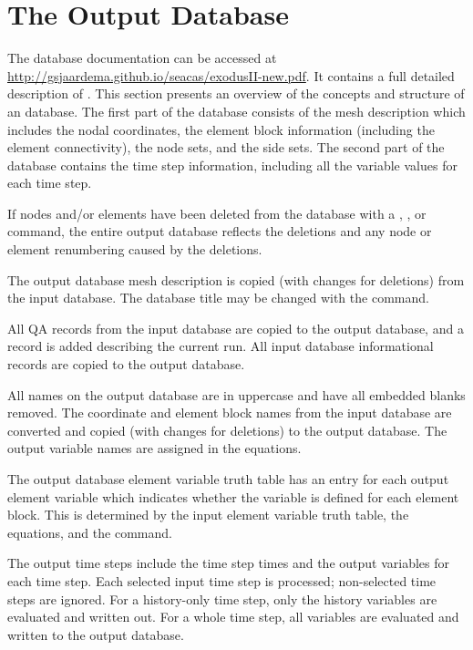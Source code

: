 \chapter{The Output \exo{} Database} \label{chap:outexo}

The \exo{} database documentation can be accessed at
\url{http://gsjaardema.github.io/seacas/exodusII-new.pdf}. It contains
a full detailed description of \exo{}. This section presents an
overview of the concepts and structure of an \exo{} database. The
first part of the \exo{} database consists of the mesh
description which includes the nodal coordinates, the
element block information (including the element connectivity), the
node sets, and the side sets. The second part of the database contains
the time step information, including all the variable values for each
time step.

If nodes and/or elements have been deleted from the database with a
, , or  command, the entire output
database reflects the deletions and any node or element renumbering
caused by the deletions.

The output database mesh description is copied (with changes for
deletions) from the input database. The database title may be changed
with the  command.

All QA records from the input database are copied to the output
database, and a record is added describing the current \caps{\PROGRAM}
run. All input database informational records are copied to the output
database.

All names on the output database are in uppercase and have all embedded
blanks removed. The coordinate and element block names from the input
database are converted and copied (with changes for deletions) to the
output database. The output variable names are assigned in the
equations.

The output database element variable truth table has an entry for each
output element variable which indicates whether the variable is defined
for each element block. This is determined by the input element variable
truth table, the equations, and the  command.

The output time steps include the time step times and the output
variables for each time step. Each selected input time step is
processed; non-selected time steps are ignored. For a history-only
time step, only the history variables are evaluated and written out. For
a whole time step, all variables are evaluated and written to the
output database.
